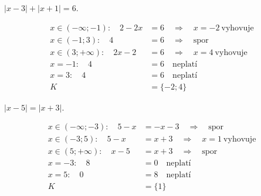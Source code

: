 \documentclass[11pt,a4paper]{article}
\begin{document}
\begin{zadaniReseniBox}[title={Samostatná práce 1}]
$|x-3|+|x+1|=6$.
\tcblower
\begin{center}
\begingroup\footnotesize
\renewcommand{\arraystretch}{1.32}
\endgroup
\end{center}
\[\begin{aligned}x\in (-\infty;-1):\quad 2 - 2 x &= 6\quad\Longrightarrow\quad x=-2\ \text{vyhovuje}\\[2pt]
x\in (-1;3):\quad 4 &= 6\quad\Longrightarrow\quad \text{spor}\\[2pt]
x\in (3;+\infty):\quad 2 x - 2 &= 6\quad\Longrightarrow\quad x=4\ \text{vyhovuje}\\[2pt]
x=-1:\quad 4 &= 6\quad\text{neplatí}\\[2pt]
x=3:\quad 4 &= 6\quad\text{neplatí}\\[2pt]
K&=\{-2;4\}\end{aligned}\]
\end{zadaniReseniBox}
\begin{zadaniReseniBox}[title={Samostatná práce 2}]
$|x-5|=|x+3|$.
\tcblower
\begin{center}
\begingroup\footnotesize
\renewcommand{\arraystretch}{1.32}
\endgroup
\end{center}
\[\begin{aligned}x\in (-\infty;-3):\quad 5 - x &= - x - 3\quad\Longrightarrow\quad \text{spor}\\[2pt]
x\in (-3;5):\quad 5 - x &= x + 3\quad\Longrightarrow\quad x=1\ \text{vyhovuje}\\[2pt]
x\in (5;+\infty):\quad x - 5 &= x + 3\quad\Longrightarrow\quad \text{spor}\\[2pt]
x=-3:\quad 8 &= 0\quad\text{neplatí}\\[2pt]
x=5:\quad 0 &= 8\quad\text{neplatí}\\[2pt]
K&=\{1\}\end{aligned}\]
\end{zadaniReseniBox}
\end{document}

